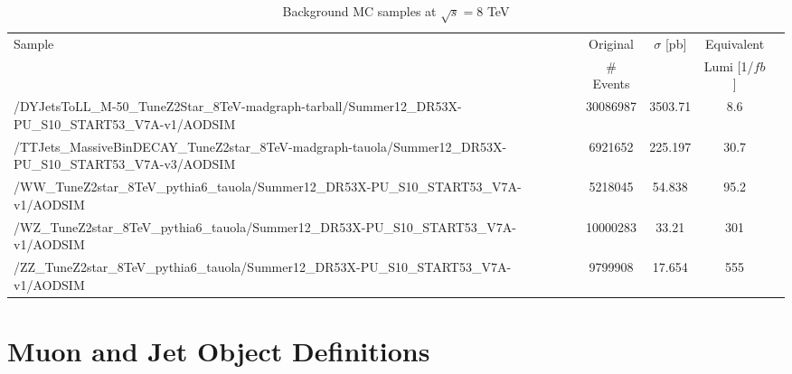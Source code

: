 \documentclass[12pt]{article}
\begin{document}
\begin{table}[h]
\begin{center}
\caption{\label{tab:BGSamples8TeV} Background MC samples at $\sqrt{s}=8$ TeV}
\begin{tabular}{|p{10cm}|c|c|c|c|} \hline
Sample & Original  & $\sigma$ [pb] & Equivalent \\
 &  \# Events &  &  Lumi [1/$fb$] \\
\hline
\hline
\scriptsize/DYJetsToLL\_M-50\_TuneZ2Star\_8TeV-madgraph-tarball/Summer12\_DR53X-PU\_S10\_START53\_V7A-v1/AODSIM &	     30086987 &	  3503.71 &   8.6  \\
\hline                                                                                                                                     
\scriptsize/TTJets\_MassiveBinDECAY\_TuneZ2star\_8TeV-madgraph-tauola/Summer12\_DR53X-PU\_S10\_START53\_V7A-v3/AODSIM &  6921652 &	  225.197 &  30.7  \\
\hline                                                                                                                                                       
\scriptsize/WW\_TuneZ2star\_8TeV\_pythia6\_tauola/Summer12\_DR53X-PU\_S10\_START53\_V7A-v1/AODSIM & 	              5218045 &	   54.838 &  95.2  \\
\hline                                                                                                                                     
\scriptsize/WZ\_TuneZ2star\_8TeV\_pythia6\_tauola/Summer12\_DR53X-PU\_S10\_START53\_V7A-v1/AODSIM &	             10000283 &	    33.21 & 301    \\
\hline                                                                                                                                     
\scriptsize/ZZ\_TuneZ2star\_8TeV\_pythia6\_tauola/Summer12\_DR53X-PU\_S10\_START53\_V7A-v1/AODSIM 	&  	              9799908 &    17.654 & 555	   \\
\hline
\end{tabular}
\end{center}
\end{table}

\section{Muon and Jet Object Definitions \label{MuonDef}}
\end{document}
